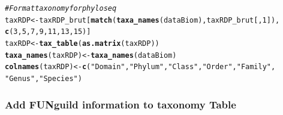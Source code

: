 \documentclass[12pt]{article}\usepackage[]{graphicx}\usepackage[]{color}
\makeatletter
\newcommand{\hlnum}[1]{\textcolor[rgb]{0.686,0.059,0.569}{#1}}%
\newcommand{\hlstr}[1]{\textcolor[rgb]{0.192,0.494,0.8}{#1}}%
\newcommand{\hlcom}[1]{\textcolor[rgb]{0.678,0.584,0.686}{\textit{#1}}}%
\newcommand{\hlstd}[1]{\textcolor[rgb]{0.345,0.345,0.345}{#1}}%
\newcommand{\hlkwb}[1]{\textcolor[rgb]{0.69,0.353,0.396}{#1}}%
\newcommand{\hlkwd}[1]{\textcolor[rgb]{0.737,0.353,0.396}{\textbf{#1}}}%
\newenvironment{kframe}{%
 \def\at@end@of@kframe{}%
 \ifinner\ifhmode%
  \def\at@end@of@kframe{\end{minipage}}%
  \begin{minipage}{\columnwidth}%
 \fi\fi%
 \def\FrameCommand##1{\hskip\@totalleftmargin \hskip-\fboxsep
 \colorbox{shadecolor}{##1}\hskip-\fboxsep
     \hskip-\linewidth \hskip-\@totalleftmargin \hskip\columnwidth}%
 \MakeFramed {\advance\hsize-\width
   \@totalleftmargin\z@ \linewidth\hsize
   \@setminipage}}%
 {\par\unskip\endMakeFramed%
 \at@end@of@kframe}
\newenvironment{knitrout}{}{} %
\numberwithin{figure}{section}
\makeatother
\begin{document}
\begin{knitrout}\small
{}\color{fgcolor}\begin{kframe}
\begin{alltt}
\hlcom{# Format taxonomy for phyloseq}
\hlstd{taxRDP} \hlkwb{<-} \hlstd{taxRDP_brut[}\hlkwd{match}\hlstd{(}\hlkwd{taxa_names}\hlstd{(dataBiom), taxRDP_brut[,} \hlnum{1}\hlstd{]),}
                       \hlkwd{c}\hlstd{(}\hlnum{3}\hlstd{,} \hlnum{5}\hlstd{,} \hlnum{7}\hlstd{,} \hlnum{9}\hlstd{,} \hlnum{11}\hlstd{,} \hlnum{13}\hlstd{,} \hlnum{15}\hlstd{)]}
\hlstd{taxRDP} \hlkwb{<-} \hlkwd{tax_table}\hlstd{(}\hlkwd{as.matrix}\hlstd{(taxRDP))}
\hlkwd{taxa_names}\hlstd{(taxRDP)} \hlkwb{<-} \hlkwd{taxa_names}\hlstd{(dataBiom)}
\hlkwd{colnames}\hlstd{(taxRDP)} \hlkwb{<-} \hlkwd{c}\hlstd{(}\hlstr{"Domain"}\hlstd{,} \hlstr{"Phylum"}\hlstd{,} \hlstr{"Class"}\hlstd{,} \hlstr{"Order"}\hlstd{,} \hlstr{"Family"}\hlstd{,}
                      \hlstr{"Genus"}\hlstd{,} \hlstr{"Species"}\hlstd{)}
\end{alltt}
\end{kframe}
\end{knitrout}


\subsubsection{Add FUNguild information to taxonomy Table}
\end{document}
